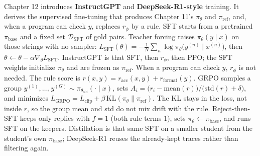 Chapter 12 introduces \textbf{InstructGPT} and \textbf{DeepSeek-R1-style} training. It derives the supervised fine-tuning that produces Chapter 11's $\pi_\theta$ and $\pi_{\mathrm{ref}}$, and, when a program can check $y$, replaces $r_\phi$ by a rule. SFT starts from a pretrained $\pi_{\mathrm{base}}$ and a fixed set $\mathcal{D}_{\mathrm{SFT}}$ of gold pairs. Teacher forcing raises $\pi_\theta(y\mid x)$ on those strings with no sampler: $L_{\mathrm{SFT}}(\theta)=-\frac1N\sum_n\log\pi_\theta\bigl(y^{(n)}\mid x^{(n)}\bigr)$, then $\theta\leftarrow\theta-\alpha\nabla_\theta L_{\mathrm{SFT}}$. InstructGPT is that SFT, then $r_\phi$, then PPO; the SFT weights initialize $\pi_\theta$ and are frozen as $\pi_{\mathrm{ref}}$. When a program can check $y$, $r_\phi$ is not needed. The rule score is $r(x,y)=r_{\mathrm{acc}}(x,y)+r_{\mathrm{format}}(y)$. GRPO samples a group $y^{(1)},\ldots,y^{(G)}\sim\pi_{\theta_{\mathrm{old}}}(\cdot\mid x)$, sets $A_i=\bigl(r_i-\mathrm{mean}(r)\bigr)/\bigl(\mathrm{std}(r)+\delta\bigr)$, and minimizes $L_{\mathrm{GRPO}}=L_{\mathrm{clip}}+\beta\,\mathrm{KL}(\pi_\theta\|\pi_{\mathrm{ref}})$. The KL stays in the loss, not inside $r$, so the group mean and std do not mix drift with the rule. Reject-then-SFT keeps only replies with $f=1$ (both rule terms $1$), sets $\pi_\theta\leftarrow\pi_{\mathrm{base}}$, and runs SFT on the keepers. Distillation is that same SFT on a smaller student from the student's own $\pi_{\mathrm{base}}$; DeepSeek-R1 reuses the already-kept traces rather than filtering again.
